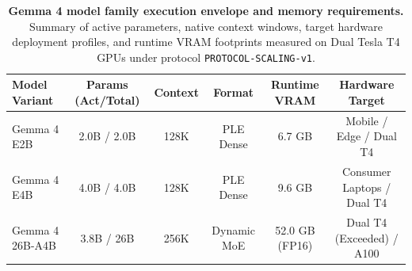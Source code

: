 \documentclass[10pt]{article}
\begin{document}
\begin{table}[!htbp]
\centering
\footnotesize
\setlength{\tabcolsep}{4.0pt}
\caption{\textbf{Gemma 4 model family execution envelope and memory requirements.} Summary of active parameters, native context windows, target hardware deployment profiles, and runtime VRAM footprints measured on Dual Tesla T4 GPUs under protocol \texttt{PROTOCOL-SCALING-v1}.}
\label{tab:gemma4_hardware_specs}
\begin{tabular}{lccccc}
\toprule
\textbf{Model Variant} & \textbf{Params (Act/Total)} & \textbf{Context} & \textbf{Format} & \textbf{Runtime VRAM} & \textbf{Hardware Target} \\
\midrule
Gemma 4 E2B & 2.0B / 2.0B & 128K & PLE Dense & 6.7 GB & Mobile / Edge / Dual T4 \\
Gemma 4 E4B & 4.0B / 4.0B & 128K & PLE Dense & 9.6 GB & Consumer Laptops / Dual T4 \\
Gemma 4 26B-A4B & 3.8B / 26B & 256K & Dynamic MoE & 52.0 GB (FP16) & Dual T4 (Exceeded) / A100 \\
\bottomrule
\end{tabular}
\end{table}
\end{document}
